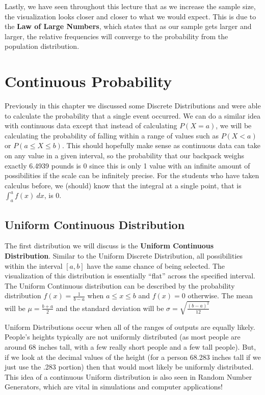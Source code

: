 \documentclass[
  letterpaper,
  DIV=11,
  numbers=noendperiod]{scrreprt}
\begin{document}
Lastly, we have seen throughout this lecture that as we increase the
sample size, the visualization looks closer and closer to what we would
expect. This is due to the \textbf{Law of Large Numbers}, which states
that as our sample gets larger and larger, the relative frequencies will
converge to the probability from the population distribution.

\section{Continuous Probability}\label{continuous-probability}

Previously in this chapter we discussed some Discrete Distributions and
were able to calculate the probability that a single event occurred. We
can do a similar idea with continuous data except that instead of
calculating \(P(X=a)\), we will be calculating the probability of
falling within a range of values such as \(P(X<a)\) or
\(P(a\leq X \leq b)\). This should hopefully make sense as continuous
data can take on any value in a given interval, so the probability that
our backpack weighs exactly 6.4939 pounds is 0 since this is only 1
value with an infinite amount of possibilities if the scale can be
infinitely precise. For the students who have taken calculus before, we
(should) know that the integral at a single point, that is
\(\int_a^a f(x)\ dx\), is 0.

\subsection{Uniform Continuous
Distribution}\label{uniform-continuous-distribution}

The first distribution we will discuss is the \textbf{Uniform Continuous
Distribution}. Similar to the Uniform Discrete Distribution, all
possibilities within the interval \([a,b]\) have the same chance of
being selected. The visualization of this distribution is essentially
``flat'' across the specified interval. The Uniform Continuous
distribution can be described by the probability distribution
\(f(x)=\frac{1}{b-a}\) when \(a\leq x \leq b\) and \(f(x)=0\) otherwise.
The mean will be \(\mu=\frac{b+a}{2}\) and the standard deviation will
be \(\sigma = \sqrt{\frac{(b-a)^2}{12}}\)

Uniform Distributions occur when all of the ranges of outputs are
equally likely. People's heights typically are not uniformly distributed
(as most people are around 68 inches tall, with a few really short
people and a few tall people). But, if we look at the decimal values of
the height (for a person 68.283 inches tall if we just use the .283
portion) then that would most likely be uniformly distributed. This idea
of a continuous Uniform distribution is also seen in Random Number
Generators, which are vital in simulations and computer applications!
\end{document}
